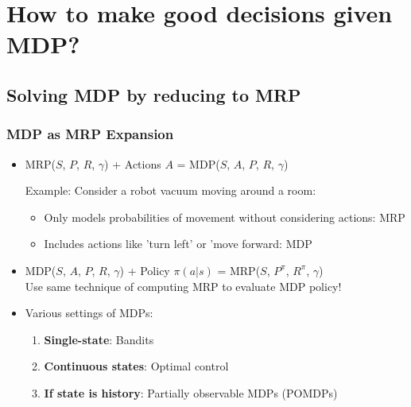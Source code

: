 \documentclass{article}
\begin{document}
\section{How to make good decisions given MDP?}
\subsection{Solving MDP by reducing to MRP}
\begin{defbox}
    \subsubsection*{MDP as MRP Expansion}
    \begin{itemize}
    \item MRP($S$, $P$, $R$, $\gamma$) + Actions $A$ = MDP($S$, $A$, $P$, $R$, $\gamma$)
        \begin{prfbox}
            Example: Consider a robot vacuum moving around a room:
            \begin{itemize}
            \item Only models probabilities of movement without considering actions: MRP
            \item Includes actions like 'turn left' or 'move forward: MDP
            \end{itemize}
        \end{prfbox}
    \item MDP($S$, $A$, $P$, $R$, $\gamma$) + Policy $\pi(a | s)$ = MRP($S$, $P^{\pi}$, $R^{\pi}$, $\gamma$)
        \\ Use same technique of computing MRP to evaluate MDP policy!
    \item Various settings of MDPs:
        \begin{enumerate}
        \item \textbf{Single-state}: Bandits
        \item \textbf{Continuous states}: Optimal control
        \item \textbf{If state is history}: Partially observable MDPs (POMDPs)
        \end{enumerate}
    \end{itemize}
\end{defbox}
\end{document}
